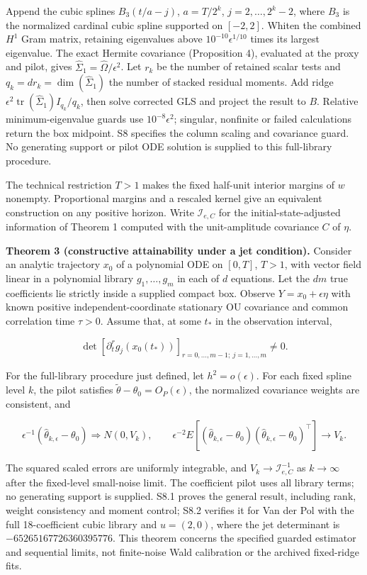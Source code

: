 \documentclass[
  american,
  11pt,
]{article}
\newcounter{none} %
\begin{document}
Append the cubic splines \(B_3(t/a-j)\), \(a=T/2^k\),
\(j=2,\ldots,2^k-2\), where \(B_3\) is the normalized cardinal cubic
spline supported on \([-2,2]\). Whiten the combined \(H^1\) Gram matrix,
retaining eigenvalues above \(10^{-10}\epsilon^{1/10}\) times its
largest eigenvalue. The exact Hermite covariance (Proposition 4),
evaluated at the proxy and pilot, gives
\(\widehat\Sigma_1=\widehat\Omega/\epsilon^2\). Let \(r_k\) be the
number of retained scalar tests and \(q_k=d r_k=\dim(\widehat\Sigma_1)\)
the number of stacked residual moments. Add ridge
\(\epsilon^2\operatorname{tr}(\widehat\Sigma_1)I_{q_k}/q_k\), then solve
corrected GLS and project the result to \(B\). Relative
minimum-eigenvalue guards use \(10^{-8}\epsilon^2\); singular, nonfinite
or failed calculations return the box midpoint. S8 specifies the column
scaling and covariance guard. No generating support or pilot ODE
solution is supplied to this full-library procedure.

The technical restriction \(T>1\) makes the fixed half-unit interior
margins of \(w\) nonempty. Proportional margins and a rescaled kernel
give an equivalent construction on any positive horizon. Write
\(\mathcal I_{e,C}\) for the initial-state-adjusted information of
Theorem 1 computed with the unit-amplitude covariance \(C\) of \(\eta\).

\textbf{Theorem 3 (constructive attainability under a jet condition).}
Consider an analytic trajectory \(x_0\) of a polynomial ODE on
\([0,T]\), \(T>1\), with vector field linear in a polynomial library
\(g_1,\ldots,g_m\) in each of \(d\) equations. Let the \(dm\) true
coefficients lie strictly inside a supplied compact box. Observe
\(Y=x_0+\epsilon\eta\) with known positive independent-coordinate
stationary OU covariance and common correlation time \(\tau>0\). Assume
that, at some \(t_*\) in the observation interval,

\[
\det[\partial_t^r g_j(x_0(t_*))]_{r=0,\ldots,m-1;\ j=1,\ldots,m}\ne0.
\]

For the full-library procedure just defined, let \(h^2=o(\epsilon)\).
For each fixed spline level \(k\), the pilot satisfies
\(\widetilde\theta-\theta_0=O_P(\epsilon)\), the normalized covariance
weights are consistent, and

\[
\epsilon^{-1}(\widehat\theta_{k,\epsilon}-\theta_0)\Rightarrow N(0,V_k),\qquad
\epsilon^{-2}E[(\widehat\theta_{k,\epsilon}-\theta_0)(\widehat\theta_{k,\epsilon}-\theta_0)^\top]\to V_k.
\]

The squared scaled errors are uniformly integrable, and
\(V_k\to\mathcal I_{e,C}^{-1}\) as \(k\to\infty\) after the fixed-level
small-noise limit. The coefficient pilot uses all library terms; no
generating support is supplied. S8.1 proves the general result,
including rank, weight consistency and moment control; S8.2 verifies it
for Van der Pol with the full 18-coefficient cubic library and
\(u=(2,0)\), where the jet determinant is \(-65265167726360395776\).
This theorem concerns the specified guarded estimator and sequential
limits, not finite-noise Wald calibration or the archived fixed-ridge
fits.
\end{document}
